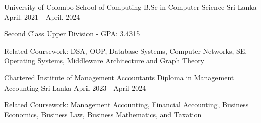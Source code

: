 

\begin{cventries}

    \cventry
    {University of Colombo School of Computing} %
    {B.Sc in Computer Science} %
    {Sri Lanka} %
    {April. 2021 - April. 2024} %
    {
        \begin{cvitems} %
            \item {Second Class Upper Division - GPA: 3.4315}
            \item {Related Coursework: DSA, OOP, Database Systems, Computer Networks, SE, Operating Systems, Middleware Architecture and Graph Theory}
        \end{cvitems}
    }

    \cventry
    {Chartered Institute of Management Accountants} %
    {Diploma in Management Accounting} %
    {Sri Lanka} %
    {April 2023 - April 2024}
    {
        \begin{cvitems} %
            \item {Related Coursework: Management Accounting, Financial Accounting, Business Economics, Business Law, Business Mathematics, and Taxation}
        \end{cvitems}
    }




\end{cventries}
